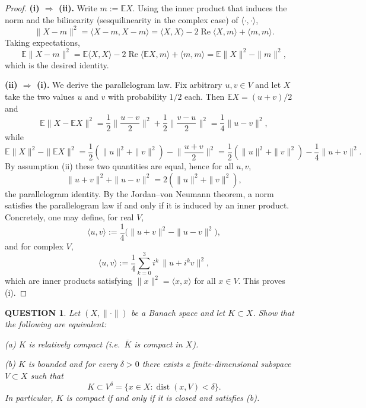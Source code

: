 \documentclass[12pt]{article}
\renewcommand{\(}{\left(}%
\renewcommand{\)}{\right)}%
\renewcommand{\[}{\left[}%
\renewcommand{\]}{\right]}%
\newtheorem{question}{QUESTION}[section]}
\newtheorem{proof}{Proof.}}
\begin{document}
\begin{proof}
\textbf{(i) $\Rightarrow$ (ii).}
Write $m:=\mathbb{E}X$. Using the inner product that induces the norm and the bilinearity (sesquilinearity in the complex case) of $\langle\cdot,\cdot\rangle$,
\begin{equation*}
\|X-m\|^2=\langle X-m,X-m\rangle=\langle X,X\rangle-2\operatorname{Re}\langle X,m\rangle+\langle m,m\rangle.
\end{equation*}
Taking expectations,
\begin{equation*}
\mathbb{E}\|X-m\|^2=\mathbb{E}\langle X,X\rangle-2\operatorname{Re}\langle \mathbb{E}X,m\rangle+\langle m,m\rangle
=\mathbb{E}\|X\|^2-\|m\|^2,
\end{equation*}
which is the desired identity.

\medskip
\textbf{(ii) $\Rightarrow$ (i).}
We derive the parallelogram law. Fix arbitrary $u,v\in V$ and let $X$ take the two values $u$ and $v$ with probability $1/2$ each. Then $\mathbb{E}X=(u+v)/2$ and
\begin{equation*}
\mathbb{E}\|X-\mathbb{E}X\|^2=\frac12\Big\|\frac{u-v}{2}\Big\|^2+\frac12\Big\|\frac{v-u}{2}\Big\|^2
=\frac14\|u-v\|^2,
\end{equation*}
while
\begin{equation*}
\mathbb{E}\|X\|^2-\|\mathbb{E}X\|^2=\frac12(\|u\|^2+\|v\|^2)-\Big\|\frac{u+v}{2}\Big\|^2
=\frac12(\|u\|^2+\|v\|^2)-\frac14\|u+v\|^2.
\end{equation*}
By assumption (ii) these two quantities are equal, hence for all $u,v$,
\begin{equation*}
\|u+v\|^2+\|u-v\|^2=2(\|u\|^2+\|v\|^2),
\end{equation*}
the parallelogram identity. By the Jordan--von Neumann theorem, a norm satisfies the parallelogram law if and only if it is induced by an inner product. Concretely, one may define, for real $V$,
\begin{equation*}
\langle u,v\rangle:=\frac14\big(\|u+v\|^2-\|u-v\|^2\big),
\end{equation*}
and for complex $V$,
\begin{equation*}
\langle u,v\rangle:=\frac14\sum_{k=0}^{3} i^k\,\|u+i^k v\|^2,
\end{equation*}
which are inner products satisfying $\|x\|^2=\langle x,x\rangle$ for all $x\in V$. This proves (i).
\end{proof}

\begin{question}
Let $(X,\|\cdot\|)$ be a Banach space and let $K\subset X$.  
Show that the following are equivalent:

\medskip
\noindent (a) $K$ is relatively compact (i.e.\ $\overline K$ is compact in $X$).

 \noindent (b) $K$ is bounded and for every $\delta>0$ there exists a finite-dimensional
  subspace $V\subset X$ such that
  \begin{equation*}
    K \subset V^\delta
    =
    \{x\in X:\operatorname{dist}(x,V)<\delta\}.
  \end{equation*}
  In particular, $K$ is compact if and only if it is closed and satisfies (b).
\end{question}
\end{document}
